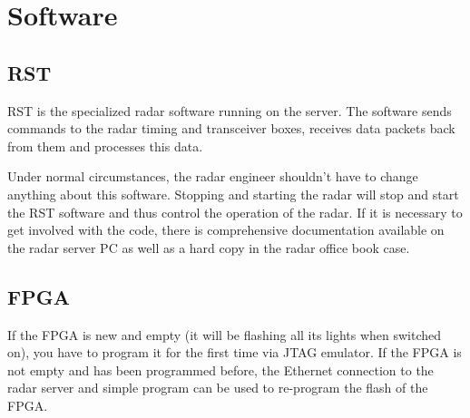 \section{Software}
\label{sec:software}

\subsection{RST}
\label{subsec:sw_rst}
RST is the specialized radar software running on the server. The software sends commands to the radar timing and transceiver boxes, receives data packets back from them and processes this data.
\par
Under normal circumstances, the radar engineer shouldn't have to change anything about this software. Stopping and starting the radar will stop and start the RST software and thus control the operation of the radar. If it is necessary to get involved with the code, there is comprehensive documentation available on the radar server PC as well as a hard copy in the radar office book case.

\clearpage

\subsection{FPGA}
\label{subsec:sw_fpga}
If the FPGA is new and empty (it will be flashing all its lights when switched on), you have to program it for the first time via JTAG emulator. If the FPGA is not empty and has been programmed before, the Ethernet connection to the radar server and simple program can be used to re-program the flash of the FPGA.

